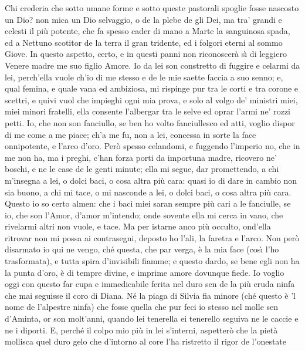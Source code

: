 \documentclass{book}
\begin{document}
	Chi crederia che sotto umane forme
	e sotto queste pastorali spoglie
	fosse nascosto un Dio? non mica un Dio
	selvaggio, o de la plebe de gli Dei,
	ma tra' grandi e celesti il pi\`u potente,
	che fa spesso cader di mano a Marte
	la sanguinosa spada, ed a Nettuno
	scotitor de la terra il gran tridente,
	ed i folgori eterni al sommo Giove.
	In questo aspetto, certo, e in questi panni
	non riconoscer\`a s\`{\i} di leggiero
	Venere madre me suo figlio Amore.
	Io da lei son constretto di fuggire
	e celarmi da lei, perch'ella vuole
	ch'io di me stesso e de le mie saette
	faccia a suo senno; e, qual femina, e quale
	vana ed ambiziosa, mi rispinge
	pur tra le corti e tra corone e scettri,
	e quivi vuol che impieghi ogni mia prova,
	e solo al volgo de' ministri miei,
	miei minori fratelli, ella consente
	l'albergar tra le selve ed oprar l'armi
	ne' rozzi petti. Io, che non son fanciullo,
	se ben ho volto fanciullesco ed atti,
	voglio dispor di me come a me piace;
	ch'a me fu, non a lei, concessa in sorte
	la face onnipotente, e l'arco d'oro.
	Per\`o spesso celandomi, e fuggendo
	l'imperio no, che in me non ha, ma i preghi,
	c'han forza porti da importuna madre,
	ricovero ne' boschi, e ne le case
	de le genti minute; ella mi segue,
	dar promettendo, a chi m'insegna a lei,
	o dolci baci, o cosa altra pi\`u cara:
	quasi io di dare in cambio non sia buono,
	a chi mi tace, o mi nasconde a lei,
	o dolci baci, o cosa altra pi\`u cara.
	Questo io so certo almen: che i baci miei
	saran sempre pi\`u cari a le fanciulle,
	se io, che son l'Amor, d'amor m'intendo;
	onde sovente ella mi cerca in vano,
	che rivelarmi altri non vuole, e tace.
	Ma per istarne anco pi\`u occulto, ond'ella
	ritrovar non mi possa ai contrasegni,
	deposto ho l'ali, la faretra e l'arco.
	Non per\`o disarmato io qui ne vengo,
	ch\'e questa, che par verga, \`e la mia face
	(cos\`{\i} l'ho trasformata), e tutta spira
	d'invisibili fiamme; e questo dardo,
	se bene egli non ha la punta d'oro,
	\`e di tempre divine, e imprime amore
	dovunque fiede. Io voglio oggi con questo
	far cupa e immedicabile ferita
	nel duro sen de la pi\`u cruda ninfa
	che mai seguisse il coro di Diana.
	N\'e la piaga di Silvia fia minore
	(ch\'e questo \`e 'l nome de l'alpestre ninfa)
	che fosse quella che pur feci io stesso
	nel molle sen d'Aminta, or son molt'anni,
	quando lei tenerella ei tenerello
	seguiva ne le caccie e ne i diporti.
	E, perch\'e il colpo mio pi\`u in lei s'interni,
	aspetter\`o che la piet\`a mollisca
	quel duro gelo che d'intorno al core
	l'ha ristretto il rigor de l'onestate
\end{document}
